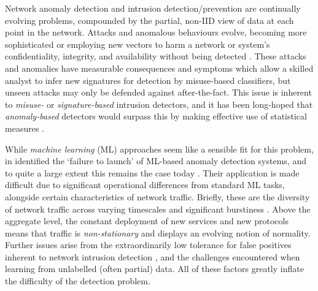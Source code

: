 \documentclass[conference, letterpaper, 10pt, times]{IEEEtran}
\begin{document}
Network anomaly detection and intrusion detection/prevention are continually evolving problems, compounded by the partial, non-IID view of data at each point in the network.
Attacks and anomalous behaviours evolve, becoming more sophisticated or employing new vectors to harm a network or system's confidentiality, integrity, and availability without being detected \cite{DBLP:journals/comsur/BhuyanBK14}.
These attacks and anomalies have measurable consequences and symptoms which allow a skilled analyst to infer new signatures for detection by misuse-based classifiers, but unseen attacks may only be defended against after-the-fact.
This issue is inherent to \emph{misuse-} or \emph{signature-based} intrusion detectors, and it has been long-hoped that \emph{anomaly-based} detectors would surpass this by making effective use of statistical measures \cite{DBLP:journals/comsur/BhuyanBK14}.

While \emph{machine learning} (ML) approaches seem like a sensible fit for this problem, in \citeyear{DBLP:conf/sp/SommerP10} \citeauthor{DBLP:conf/sp/SommerP10} identified the `failure to launch' of ML-based anomaly detection systems, and to quite a large extent this remains the case today \cite{DBLP:conf/sp/SommerP10}.
Their application is made difficult due to significant operational differences from standard ML tasks, alongside certain characteristics of network traffic.
Briefly, these are the diversity of network traffic across varying timescales \cite{DBLP:conf/sp/SommerP10} and significant burstiness \cite{DBLP:journals/ccr/LelandWTW95}.
Above the aggregate level, the constant deployment of new services and new protocols means that traffic is \emph{non-stationary} and displays an evolving notion of normality.
Further issues arise from the extraordinarily low tolerance for false positives inherent to network intrusion detection \cite{DBLP:conf/ccs/Axelsson99}, and the challenges encountered when learning from unlabelled (often partial) data.
All of these factors greatly inflate the difficulty of the detection problem.
\end{document}
